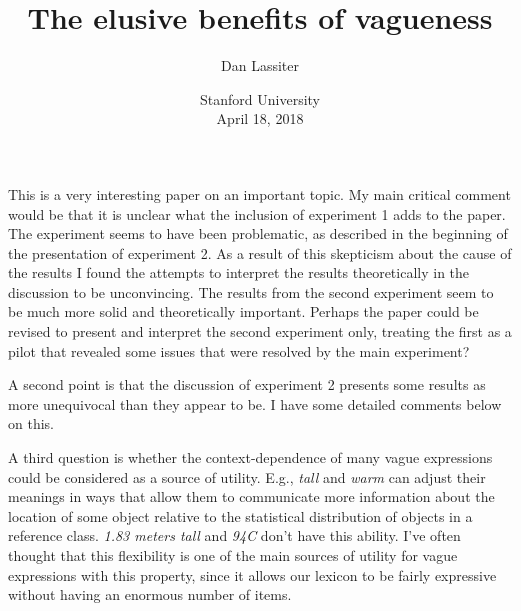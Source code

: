 \documentclass[10pt,a4paper]{article}
\begin{document}
\title{The elusive benefits of vagueness}
\author{Dan Lassiter}
\date{%
    Stanford University\\[2ex]%
    April 18, 2018
}

\maketitle

This is a very interesting paper on an important topic. My main critical comment would be that it is unclear what the inclusion of experiment 1 adds to the paper. The experiment seems to have been problematic, as described in the beginning of the presentation of experiment 2. As a result of this skepticism about the cause of the results I found the attempts to interpret the results theoretically in the discussion to be unconvincing. The results from the second experiment seem to be much more solid and theoretically important. Perhaps the paper could be revised to present and interpret the second experiment only, treating the first as a pilot that revealed some issues that were resolved by the main experiment?

A second point is that the discussion of experiment 2 presents some results as more unequivocal than they appear to be. I have some detailed comments below on this.

A third question is whether the context-dependence of many vague expressions could be considered as a source of utility. E.g., \emph{tall} and \emph{warm} can adjust their meanings in ways that allow them to communicate more information about the location of some object relative to the statistical distribution of objects in a reference class. \emph{1.83 meters tall} and \emph{94C} don't have this ability. I've often thought that this flexibility is one of the main sources of utility for vague expressions with this property, since it allows our lexicon to be fairly expressive without having an enormous number of items.
\end{document}
